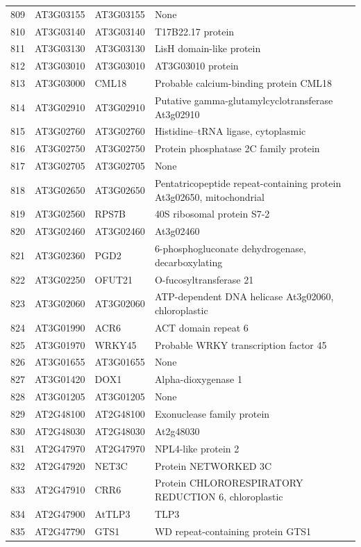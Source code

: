 \documentclass[11pt]{article}
\begin{document}
\begin{center}
\begin{tabular}{rlll}
809 & AT3G03155 & AT3G03155 & None\\
810 & AT3G03140 & AT3G03140 & T17B22.17 protein\\
811 & AT3G03130 & AT3G03130 & LisH domain-like protein\\
812 & AT3G03010 & AT3G03010 & AT3G03010 protein\\
813 & AT3G03000 & CML18 & Probable calcium-binding protein CML18\\
814 & AT3G02910 & AT3G02910 & Putative gamma-glutamylcyclotransferase At3g02910\\
815 & AT3G02760 & AT3G02760 & Histidine--tRNA ligase, cytoplasmic\\
816 & AT3G02750 & AT3G02750 & Protein phosphatase 2C family protein\\
817 & AT3G02705 & AT3G02705 & None\\
818 & AT3G02650 & AT3G02650 & Pentatricopeptide repeat-containing protein At3g02650, mitochondrial\\
819 & AT3G02560 & RPS7B & 40S ribosomal protein S7-2\\
820 & AT3G02460 & AT3G02460 & At3g02460\\
821 & AT3G02360 & PGD2 & 6-phosphogluconate dehydrogenase, decarboxylating\\
822 & AT3G02250 & OFUT21 & O-fucosyltransferase 21\\
823 & AT3G02060 & AT3G02060 & ATP-dependent DNA helicase At3g02060, chloroplastic\\
824 & AT3G01990 & ACR6 & ACT domain repeat 6\\
825 & AT3G01970 & WRKY45 & Probable WRKY transcription factor 45\\
826 & AT3G01655 & AT3G01655 & None\\
827 & AT3G01420 & DOX1 & Alpha-dioxygenase 1\\
828 & AT3G01205 & AT3G01205 & None\\
829 & AT2G48100 & AT2G48100 & Exonuclease family protein\\
830 & AT2G48030 & AT2G48030 & At2g48030\\
831 & AT2G47970 & AT2G47970 & NPL4-like protein 2\\
832 & AT2G47920 & NET3C & Protein NETWORKED 3C\\
833 & AT2G47910 & CRR6 & Protein CHLORORESPIRATORY REDUCTION 6, chloroplastic\\
834 & AT2G47900 & AtTLP3 & TLP3\\
835 & AT2G47790 & GTS1 & WD repeat-containing protein GTS1\\

\end{tabular}
\end{center}
\end{document}
